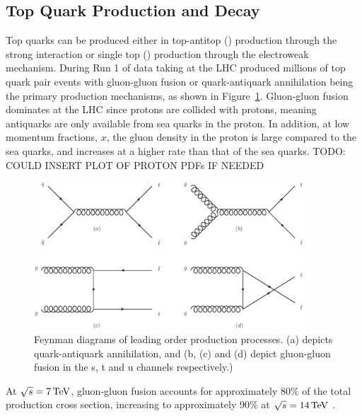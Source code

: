 \subsection{Top Quark Production and Decay}
\label{ss:top_quark_production_and_decay}
Top quarks can be produced either in top-antitop (\ttbar) production through the strong interaction or single
top (\tquark) production through the electroweak mechanism. During Run 1 of data taking at the LHC produced
millions of top quark pair events with gluon-gluon fusion or quark-antiquark annihilation being the primary
production mechanisms, as shown in Figure~\ref{fig:ttbar_production}. Gluon-gluon fusion dominates at the LHC
since protons are collided with protons, meaning antiquarks are only available from sea quarks in the proton.
In addition, at low momentum fractions, $x$, the gluon density in the proton is large compared to the sea
quarks, and increases at a higher rate than that of the sea quarks. TODO: COULD INSERT PLOT OF PROTON
PDFs IF NEEDED %

\begin{figure}[hbtp]
   \centering
     \includegraphics[width=0.9\textwidth]{Chapters/02_Theory/Images/ttbar_production}\hfill \caption{Feynman
     diagrams of leading order \ttbar production processes. (a) depicts quark-antiquark annihilation, and (b,
     (c) and (d) depict gluon-gluon fusion in the s, t and u channels respectively.)}
     \label{fig:ttbar_production}
\end{figure}

At $\sqrt{s}=7\,\text{Te\hspace{-.08em}V}$, gluon-gluon fusion accounts for approximately 80\% of the total \tquark production cross
section, increasing to approximately 90\% at $\sqrt{s}=14\,\text{Te\hspace{-.08em}V}$ \cite{Agashe:2014kda}.

